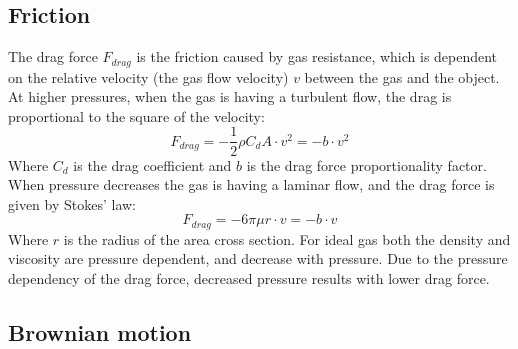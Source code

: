 \documentclass[\main/master.tex]{subfiles}
\begin{document}
\subsection{Friction}
The drag force $F_{drag}$ is the friction caused by gas resistance, which is dependent on the relative velocity (the gas flow velocity) $v$ between the gas and the object. At higher pressures, when the gas is having a turbulent flow, the drag is proportional to the square of the velocity:
\begin{equation}
F_{drag} = -\frac{1}{2}\rho C_d A \cdot v^2 = -b\cdot v^2 
\label{eqn:drag force}
\end{equation}
Where $C_d$ is the drag coefficient and $b$ is the drag force proportionality factor. When pressure decreases the gas is having a laminar flow, and the drag force is given by Stokes' law:
\begin{equation}
F_{drag} = -6\pi\mu r\cdot v = -b\cdot v
\label{eqn:drag force}
\end{equation}
Where $r$ is the radius of the area cross section. For ideal gas both the density and viscosity are pressure dependent, and decrease with pressure. Due to the pressure dependency of the drag force, decreased pressure results with lower drag force.

\subsection{Brownian motion}
\end{document}
